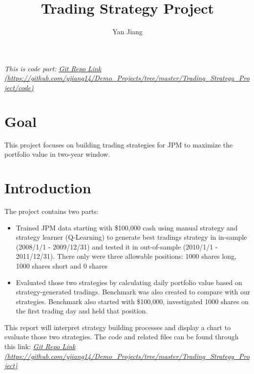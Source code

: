 \documentclass{amia}
\begin{document}
\title{Trading Strategy Project}

\author{Yan Jiang}

\institutes{
}

\maketitle

\textit{This is code part: \href{https://github.com/yjiang14/Demo_Projects/tree/master/Trading_Strategy_Project/code}{Git Repo Link (https://github.com/yjiang14/Demo\_Projects/tree/master/Trading\_Strategy\_Project/code)}}

\section*{Goal}
This project focuses on building trading strategies for JPM to maximize the portfolio value in two-year window. 

\section*{Introduction}
The project contains two parts:
\vspace{-3mm}
\begin{itemize}
	\item Trained JPM data starting with \$100,000 cash using manual strategy and strategy learner (Q-Learning) to generate best tradings strategy in in-sample (2008/1/1 - 2009/12/31) and tested it in out-of-sample (2010/1/1 - 2011/12/31). There only were three allowable positions: 1000 shares long, 1000 shares short and 0 shares
	\item Evaluated those two strategies by calculating daily portfolio value based on strategy-generated tradings. Benchmark was also created to compare with our strategies. Benchmark also started with \$100,000, investigated 1000 shares on the first trading day and held that position. 
	\end{itemize}
\vspace{-3mm}
This report will interpret strategy building processes and display a chart to evaluate those two strategies. The code and related files can be found through this link: \textit{\href{https://github.com/yjiang14/Demo_Projects/tree/master/Trading_Strategy_Project}{Git Repo Link (https://github.com/yjiang14/Demo\_Projects/tree/master/Trading\_Strategy\_Project)}}
\end{document}
